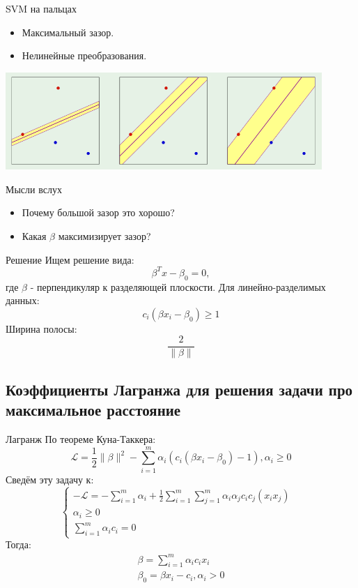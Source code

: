 \documentclass[14pt, fleqn, xcolor={dvipsnames, table}]{beamer}
\begin{document}
\begin{frame}{SVM на пальцах}
\begin{itemize}
  \item Максимальный зазор.
  \item Нелинейные преобразования.
\end{itemize}
\begin{center}
\includegraphics[width=0.9\textwidth]{SVM_1.png}
\end{center}
\end{frame}

\begin{frame}{Мысли вслух}
\begin{itemize}
  \item Почему большой зазор это хорошо?
  \item Какая $\beta$ максимизирует зазор? 
\end{itemize}
\end{frame}

\begin{frame}{Решение}
Ищем решение вида: \
$$
\beta^Tx - \beta_0 = 0,
$$ 
где $\beta$ - перпендикуляр к разделяющей плоскости. Для линейно-разделимых данных: \
$$
c_i(\beta x_i - \beta_0) \ge 1
$$
Ширина полосы: \
$$
\frac{2}{\|\beta\|}
$$
\end{frame}

\subsection{Коэффициенты Лагранжа для решения задачи про максимальное расстояние}
\begin{frame}{Лагранж}
По теореме Куна-Таккера: \
$$
\mathcal{L} = \frac{1}{2}\|\beta\|^2 - \sum_{i=1}^m\alpha_i(c_i(\beta x_i - \beta_0) - 1), \alpha_i \ge 0
$$ 
Сведём эту задачу к: \
$$
\left\{  
           \begin{array}{ll}  
            -\mathcal{L} = -\sum_{i=1}^m\alpha_i + \frac{1}{2}\sum_{i=1}^m\sum_{j=1}^m\alpha_i\alpha_jc_ic_j(x_ix_j) \\  
            \alpha_i \ge 0 & \\
            \sum_{i=1}^m\alpha_ic_i = 0
           \end{array}   
           \right.
$$
Тогда: \
$$\begin{array}{l}
\beta = \sum_{i=1}^m\alpha_ic_ix_i \\
\beta_0 = \beta x_i - c_i, \alpha_i > 0
\end{array}$$
\end{frame}
\end{document}

